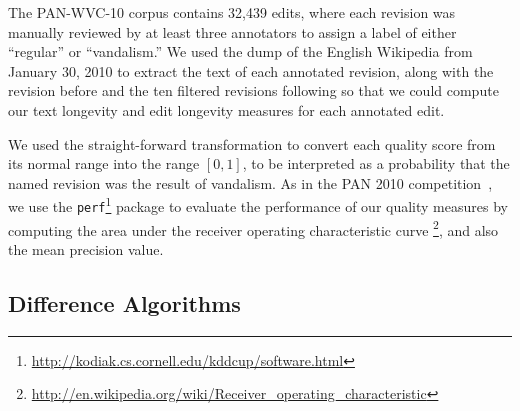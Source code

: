 The PAN-WVC-10 corpus contains 32,439 edits, where each revision was
manually reviewed by at least three annotators to assign a label
of either ``regular'' or ``vandalism.''
We used the dump of the English Wikipedia from January 30, 2010
to extract the text of each annotated revision, along with the revision
before and the ten filtered revisions following so that we could compute
our text longevity and edit longevity measures for each annotated edit.

We used the straight-forward transformation to convert
each quality score from its normal range into the range
$[0,1]$, to be interpreted as a probability that the named
revision was the result of vandalism.
As in the PAN 2010 competition~\cite{Potthast2010b}, we use the
\texttt{perf}\footnote{\url{http://kodiak.cs.cornell.edu/kddcup/software.html}}
package to evaluate the performance of our quality measures
by computing the area under the receiver operating characteristic
curve \footnote{\url{http://en.wikipedia.org/wiki/Receiver_operating_characteristic}},
and also the mean precision value.

\subsection{Difference Algorithms}

